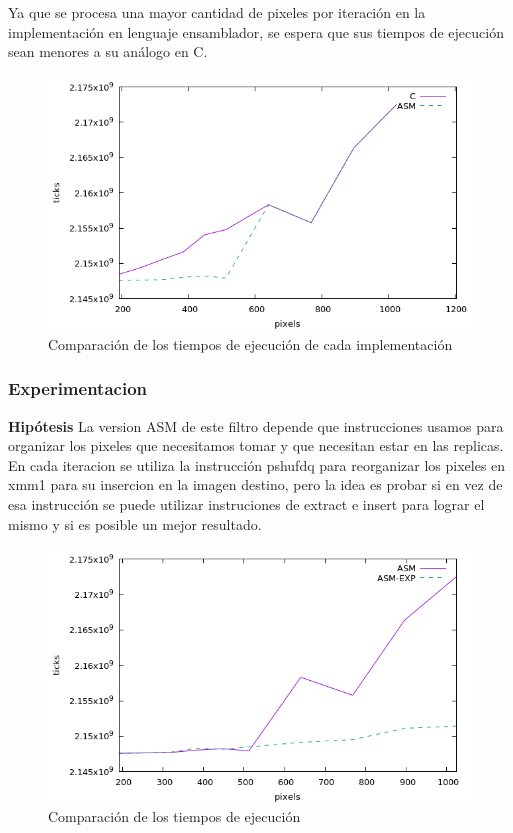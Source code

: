 \documentclass[a4paper]{article}
\begin{document}
Ya que se procesa una mayor cantidad de pixeles por iteración en la implementación en lenguaje ensamblador, se espera que sus tiempos de ejecución sean menores a su análogo en C.

\begin{figure}[H]
	\begin{center}
		\includegraphics[scale=0.77]{imagenes/smalltiles-CvsASM.png}
	\caption{Comparación de los tiempos de ejecución de cada implementación}
	\label{smalltiles_asmvsc}
  \end{center}
\end{figure}



\subsubsection{Experimentacion}
\textbf{Hipótesis}
\newline
La version ASM de este filtro depende que instrucciones usamos para organizar los pixeles que necesitamos tomar  y que necesitan estar en las replicas. En cada iteracion se utiliza la instrucción pshufdq para reorganizar los pixeles en xmm1 para su insercion en la imagen destino, pero la idea es probar si en vez de esa instrucción se puede utilizar instruciones de extract e insert para lograr el mismo y si es posible un mejor resultado.

\begin{figure}[H]
  \begin{center}
	\includegraphics[scale=0.77]{imagenes/smalltiles-Exp.png}
	\caption{Comparación de los tiempos de ejecución}
	\label{rotar_exp}
  \end{center}
\end{figure}
\end{document}
